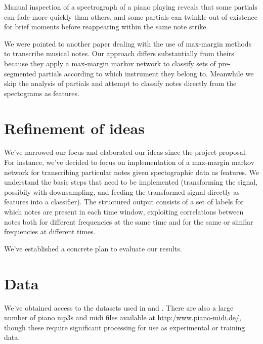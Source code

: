 \documentclass{article}
\begin{document}
Manual inspection of a spectrograph of a piano playing reveals that some
partials can fade more quickly than others, and some partials can twinkle out
of existence for brief moments before reappearing within the same note strike.

We were pointed to another paper \cite{gang2009polyphonic} dealing with the use
of max-margin methods to transcribe musical notes. Our approach differs
substantially from theirs because they apply a max-margin markov network to
classify sets of pre-segmented partials according to which instrument they
belong to. Meanwhile we skip the analysis of partials and attempt to classify
notes directly from the spectograms as features. 


\section{Refinement of ideas}
We've narrowed our focus and elaborated our ideas since the project proposal.
For instance, we've decided to focus on implementation of a max-margin markov
network for transcribing particular notes given spectographic data as features.
We understand the basic steps that need to be implemented (transforming the
signal, possibily with downsampling, and feeding the transformed signal
directly as features into a classifier). The structured output consists of
a set of labels for which notes are present in each time window, exploiting
correlations between notes both for different frequencies at the same time and
for the same or similar frequencies at different times.

We've established a concrete plan to evaluate our results.


\section{Data}
We've obtained access to the datasets used in \cite{poliner2006discriminative}
and \cite{marolt2004connectionist}. There are also a large number of piano
mp3s and midi files available at \url{http:/www.piano-midi.de/}, though these
require significant processing for use as experimental or training data.




\end{document}
